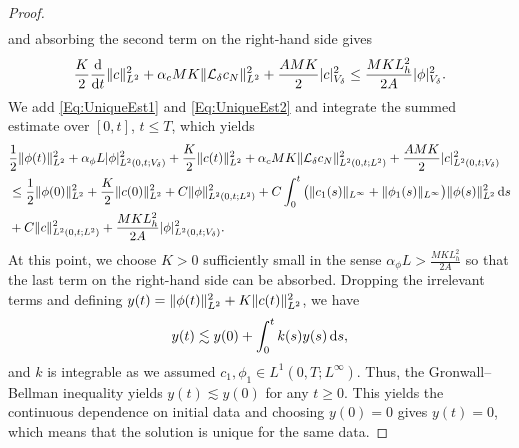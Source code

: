 \documentclass[]{article}
\newcommand{\ds}{\,\textup{d}s}
\newcommand{\ddt}{\frac{\textup{d}}{\textup{d}t}}
\DeclarePairedDelimiter{\abs}{\lvert}{\rvert}
\DeclarePairedDelimiter{\norm}{\lVert}{\rVert}
\begin{document}
\begin{proof}
$$\begin{aligned}
	\end{aligned}$$
	and absorbing the second term on the right-hand side gives
	\begin{equation}\label{Eq:UniqueEst2}
		\dfrac{K}{2}\ddt\norm{c}_{L^{2}}^{2}
		+\alpha_c MK \norm{\mathcal{L}_\delta c_N}_{L^2}^2+\frac{AMK}{2} \abs{c}_{V_\delta}^2
		\leq \frac{MKL_h^2}{2A} \abs{\phi}_{V_\delta}^2.
	\end{equation}	
	We add \eqref{Eq:UniqueEst1} and \eqref{Eq:UniqueEst2} and integrate the summed estimate over $[0,t]$, $t \leq T$, which yields
	$$\begin{aligned}
		&\dfrac12\norm{\phi(t)}_{L^{2}}^{2}
		+\alpha_\phi L  \abs{\phi}_{L^2(0,t;V_\delta)}^2 +\dfrac{K}{2}\norm{c(t)}_{L^{2}}^{2}+\alpha_c MK \norm{\mathcal{L}_\delta c_N}_{L^2(0,t;L^2)}^2
		+\frac{AMK}{2} \abs{c}_{L^2(0,t;V_\delta)}^2
		\\ &\leq \dfrac12\|\phi(0)\|_{L^{2}}^{2}+\dfrac{K}{2}\|c(0)\|_{L^{2}}^{2}+C\norm{\phi}^2_{L^2(0,t;L^2)} + C\int_0^t \big(\|c_1(s)\|_{L^\infty}+\|\phi_1(s)\|_{L^\infty}\big) \|\phi(s)\|^2_{L^2} \ds\\
		&+ C\norm{c}^2_{L^2(0,t;L^2)} + \frac{MKL_h^2}{2A} \abs{\phi}_{L^2(0,t;V_\delta)}^2.
	\end{aligned}$$
	At this point, we choose $K>0$ sufficiently small in the sense
	$\alpha_\phi L>\frac{MKL_h^2}{2A}$ so that the last term on the right-hand side can be absorbed. Dropping the irrelevant terms and defining $y(t)=\norm{\phi(t)}_{L^2}^2 + K \norm{c(t)}_{L^2}^2$, we have
	$$
	y(t) \lesssim y(0)+\int_0^t k(s) y(s)\ds,
	$$
	and $k$ is integrable as we assumed $c_1,\phi_1 \in L^1(0,T;L^\infty)$. Thus, the Gronwall--Bellman inequality \cite[Lemma II.4.10]{boyer2012mathematical} yields $y(t) \lesssim y(0)$ for any $t \geq 0$. This yields the continuous dependence on initial data and choosing $y(0)=0$ gives $y(t)=0$, which means that the solution is unique for the same data.
\end{proof}
\end{document}
